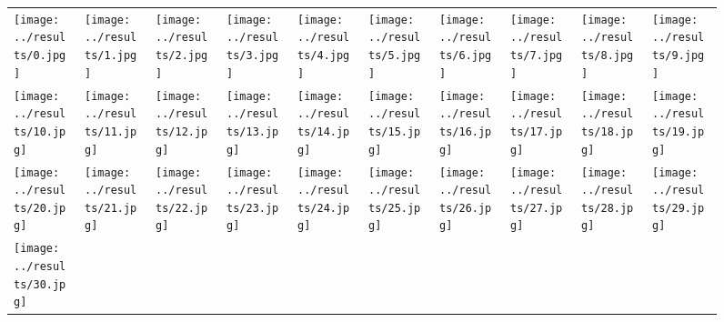 

\begin{figure}[hbt]
\centering
\label{fig:1}
\begin{tabular}{ l l l l l l l l l l }
  \texttt{[image: ../results/0.jpg]} &
  \texttt{[image: ../results/1.jpg]} &
  \texttt{[image: ../results/2.jpg]} &
  \texttt{[image: ../results/3.jpg]} &
  \texttt{[image: ../results/4.jpg]} &
  \texttt{[image: ../results/5.jpg]} &
  \texttt{[image: ../results/6.jpg]} &
  \texttt{[image: ../results/7.jpg]} &
  \texttt{[image: ../results/8.jpg]} &
  \texttt{[image: ../results/9.jpg]} \\
  \texttt{[image: ../results/10.jpg]} & 
  \texttt{[image: ../results/11.jpg]} &
  \texttt{[image: ../results/12.jpg]} &
  \texttt{[image: ../results/13.jpg]} &
  \texttt{[image: ../results/14.jpg]} &
  \texttt{[image: ../results/15.jpg]} &
  \texttt{[image: ../results/16.jpg]} &
  \texttt{[image: ../results/17.jpg]} &
  \texttt{[image: ../results/18.jpg]} &
  \texttt{[image: ../results/19.jpg]} \\ 
  \texttt{[image: ../results/20.jpg]} &
  \texttt{[image: ../results/21.jpg]} &
  \texttt{[image: ../results/22.jpg]} &
  \texttt{[image: ../results/23.jpg]} &
  \texttt{[image: ../results/24.jpg]} &
  \texttt{[image: ../results/25.jpg]} &
  \texttt{[image: ../results/26.jpg]} &
  \texttt{[image: ../results/27.jpg]} &
  \texttt{[image: ../results/28.jpg]} &
  \texttt{[image: ../results/29.jpg]} \\ 
  \texttt{[image: ../results/30.jpg]} &

\end{tabular}
\end{figure}
